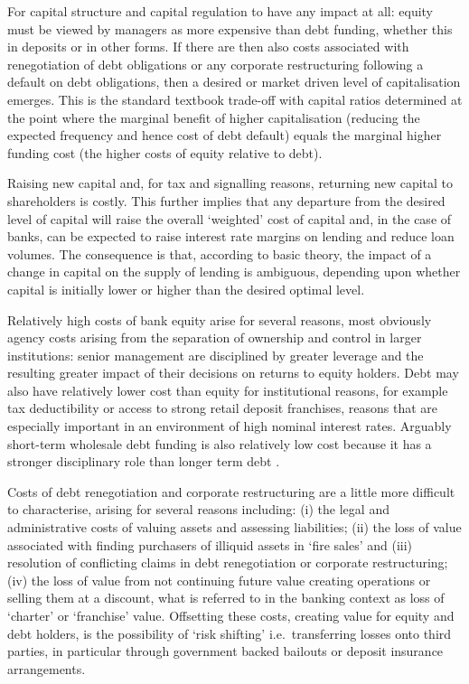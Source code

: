 \documentclass[
]{article}
\begin{document}
For capital structure and capital regulation to have any impact at all: equity must be viewed by managers as more expensive than debt funding, whether this in deposits or in other forms. If there are then also costs associated with renegotiation of debt obligations or any corporate restructuring following a default on debt obligations, then a desired or market driven level of capitalisation emerges. This is the standard textbook trade-off with capital ratios determined at the point where the marginal benefit of higher capitalisation (reducing the expected frequency and hence cost of debt default) equals the marginal higher funding cost (the higher costs of equity relative to debt).

Raising new capital and, for tax and signalling reasons, returning new capital to shareholders is costly. This further implies that any departure from the desired level of capital will raise the overall `weighted' cost of capital and, in the case of banks, can be expected to raise interest rate margins on lending and reduce loan volumes. The consequence is that, according to basic theory, the impact of a change in capital on the supply of lending is ambiguous, depending upon whether capital is initially lower or higher than the desired optimal level.

Relatively high costs of bank equity arise for several reasons, most obviously agency costs arising from the separation of ownership and control in larger institutions: senior management are disciplined by greater leverage and the resulting greater impact of their decisions on returns to equity holders. Debt may also have relatively lower cost than equity for institutional reasons, for example tax deductibility or access to strong retail deposit franchises, reasons that are especially important in an environment of high nominal interest rates. Arguably short-term wholesale debt funding is also relatively low cost because it has a stronger disciplinary role than longer term debt \citep{calomiris1991role}.

Costs of debt renegotiation and corporate restructuring are a little more difficult to characterise, arising for several reasons including: (i) the legal and administrative costs of valuing assets and assessing liabilities; (ii) the loss of value associated with finding purchasers of illiquid assets in `fire sales' and (iii) resolution of conflicting claims in debt renegotiation or corporate restructuring; (iv) the loss of value from not continuing future value creating operations or selling them at a discount, what is referred to in the banking context as loss of `charter' or `franchise' value. Offsetting these costs, creating value for equity and debt holders, is the possibility of `risk shifting' i.e.~transferring losses onto third parties, in particular through government backed bailouts or deposit insurance arrangements.
\end{document}
